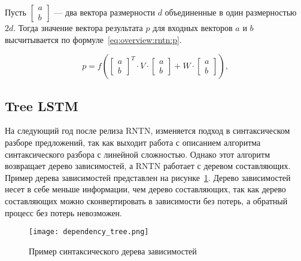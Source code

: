 Пусть $\begin{bmatrix}a\\b\end{bmatrix}$ --- два вектора размерности $d$ объединенные в один размерностью $2d$. Тогда значение вектора результата $p$ для входных векторов $a$ и $b$ высчитывается по формуле~\ref{eq:overview:rntn:p}\cite{RNTN}.

\begin{equation}
  \label{eq:overview:rntn:p}
  p = f(
  \begin{bmatrix}
    a\\
    b
  \end{bmatrix}^{T}\cdot{V}\cdot{
  \begin{bmatrix}
    a\\
    b
  \end{bmatrix}} + W\cdot{
  \begin{bmatrix}
    a\\
    b
  \end{bmatrix}}),
\end{equation}


\subsection{Tree LSTM}
На следующий год после релиза RNTN, изменяется подход в синтаксическом разборе предложений, так как выходит работа с описанием алгоритма синтаксического разбора с линейной сложностью. Однако этот алгоритм возвращает дерево зависимостей, а RNTN работает с деревом составляющих. Пример дерева зависимостей представлен на рисунке~\ref{fig:overview:dependency_tree}. Дерево зависимостей несет в себе меньше информации, чем дерево составляющих, так как дерево составляющих можно сконвертировать в зависимости без потерь, а обратный процесс без потерь невозможен\cite{Chomsky}.

\begin{figure}[h]
  \begin{center}
    \texttt{[image: dependency\_tree.png]}
    \caption{Пример синтаксического дерева зависимостей}\label{fig:overview:dependency_tree}
  \end{center}
\end{figure}

